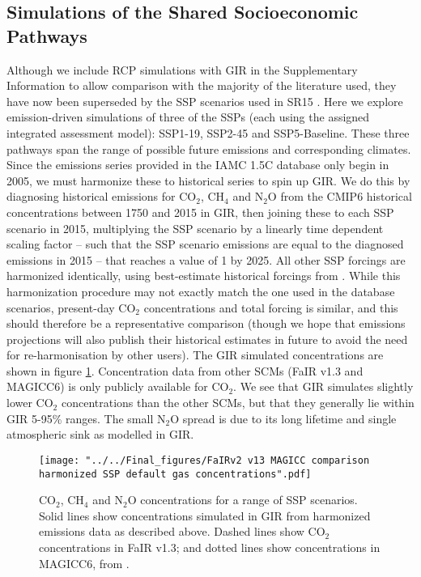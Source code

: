 \documentclass[gmd, manuscript]{copernicus}
\begin{document}
\subsection*{Simulations of the Shared Socioeconomic Pathways}
Although we include RCP simulations with GIR in the Supplementary Information to allow comparison with the majority of the literature used, they have now been superseded by the SSP scenarios used in SR15 \citep{Riahi2017,IPCC2018}. Here we explore emission-driven simulations of three of the SSPs (each using the assigned integrated assessment model): SSP1-19, SSP2-45 and SSP5-Baseline. These three pathways span the range of possible future emissions and corresponding climates. Since the emissions series provided in the IAMC 1.5C database \citep{Huppmann:2018:scenario-data} only begin in 2005, we must harmonize these to historical series to spin up GIR. We do this by diagnosing historical emissions for CO$_2$, CH$_4$ and N$_2$O from the CMIP6 historical concentrations \citep{Meinshausen2017} between 1750 and 2015 in GIR, then joining these to each SSP scenario in 2015, multiplying the SSP scenario by a linearly time dependent scaling factor -- such that the SSP scenario emissions are equal to the diagnosed emissions in 2015 -- that reaches a value of 1 by 2025. All other SSP forcings are harmonized identically, using best-estimate historical forcings from \cite{Forster2013}. While this harmonization procedure may not exactly match the one used in the database scenarios, present-day CO$_2$ concentrations and total forcing is similar, and this should therefore be a representative comparison (though we hope that emissions projections will also publish their historical estimates in future to avoid the need for re-harmonisation by other users). The GIR simulated concentrations are shown in figure \ref{fig:SSPconcs}. Concentration data from other SCMs (FaIR v1.3 and MAGICC6) is only publicly available for CO$_2$. We see that GIR simulates slightly lower CO$_2$ concentrations than the other SCMs, but that they generally lie within GIR 5-95\% ranges. The small N$_2$O spread is due to its long lifetime and single atmospheric sink as modelled in GIR.\\
\begin{figure}[t]
    \texttt{[image: "../../Final\_figures/FaIRv2 v13 MAGICC comparison harmonized SSP default gas concentrations".pdf]}
    \caption{CO$_2$, CH$_4$ and N$_2$O concentrations for a range of SSP scenarios. Solid lines show concentrations simulated in GIR from harmonized emissions data as described above. Dashed lines show CO$_2$ concentrations in FaIR v1.3; and dotted lines show concentrations in MAGICC6, from \cite{Huppmann:2018:scenario-data}.}
    \label{fig:SSPconcs}
\end{figure}
\end{document}
